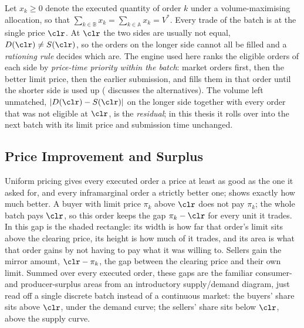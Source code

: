 Let $x_k \ge 0$ denote the executed quantity of order $k$ under a
volume-maximising allocation, so that $\sum_{k \in \mathbb{B}} x_k =
\sum_{k \in \mathbb{A}} x_k = V^{*}$. Every trade of the batch is at the
single price $\clr$. At $\clr$ the two sides are usually not equal,
$D(\clr) \ne S(\clr)$, so the orders on the longer side cannot all be
filled and a \emph{rationing rule} decides which are. The engine used here
ranks the eligible orders of each side by \emph{price-time priority within
the batch}: market orders first, then the better limit price, then the
earlier submission, and fills them in that order until the shorter side
is used up ( discusses the alternatives). The volume
left unmatched, $|D(\clr) - S(\clr)|$ on the longer side together with
every order that was not eligible at $\clr$, is the \emph{residual}; in
this thesis it rolls over into the next batch with its limit price and
submission time unchanged.

\subsection{Price Improvement and Surplus}

Uniform pricing gives every executed order a price at least as good as
the one it asked for, and every inframarginal order a strictly better
one;  shows exactly how much better. A buyer
with limit price $\pi_k$ above $\clr$ does not pay $\pi_k$; the whole
batch pays $\clr$, so this order keeps the gap $\pi_k - \clr$ for every
unit it trades. In  this gap is the shaded
rectangle: its width is how far that order's limit sits above the
clearing price, its height is how much of it trades, and its area is
what that order gains by not having to pay what it was willing to.
Sellers gain the mirror amount, $\clr - \pi_k$, the gap between the
clearing price and their own limit. Summed over every executed order,
these gaps are the familiar consumer- and producer-surplus areas from an
introductory supply/demand diagram, just read off a single discrete
batch instead of a continuous market: the buyers' share sits above
$\clr$, under the demand curve; the sellers' share sits below $\clr$,
above the supply curve.


